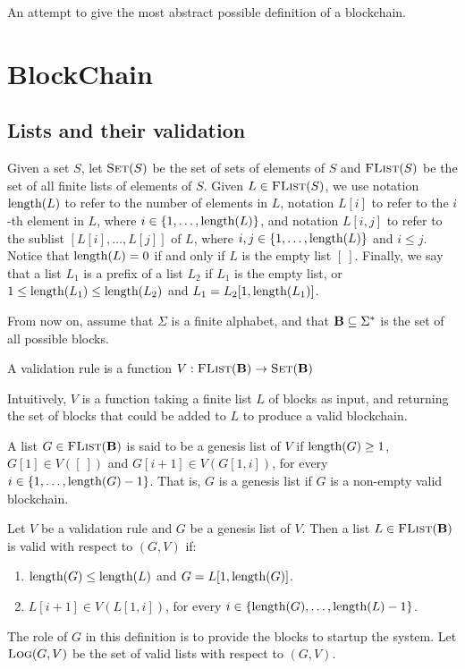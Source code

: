 
An attempt to give the most abstract possible definition of a blockchain.

\section{BlockChain}

\subsection{Lists and their validation}

Given a set $S$, let $\text{\sc Set}(S)$ be the set of sets of elements of $S$ and $\text{\sc FList}(S)$ be the set of all finite lists of elements of $S$. Given $L \in \text{\sc FList}(S)$, we use notation $\text{\rm length}(L)$ to refer to the number of elements in $L$, notation $L[i]$ to refer to the $i$-th element in $L$, where $i \in \{1, \ldots, \text{\rm length}(L)\}$, and notation $L[i,j]$ to refer to the sublist $[L[i], \ldots, L[j]]$ of $L$, where $i,j \in \{1, \ldots, \text{\rm length}(L)\}$ and $i \leq j$. Notice that $\text{\rm length}(L) = 0$ if and only if $L$ is the empty list $[\ ]$. Finally, we say that a list $L_1$ is a prefix of a list $L_2$ if $L_1$ is the empty list, or $1 \leq \text{\rm length}(L_1) \leq \text{\rm length}(L_2)$ and $L_1 = L_2[1, \text{\rm length}(L_1)]$. 

From now on, assume that $\Sigma$ is a finite alphabet, and that $\text{\bf B} \subseteq \Sigma^*$ is the set of all possible blocks.  

\begin{mydef}
	A validation rule is a function $V : \text{\sc FList}(\text{\bf B}) \to \text{\sc Set}(\text{\bf B})$
\end{mydef}
Intuitively, $V$ is a function taking a finite list $L$ of blocks as input, and returning the set of blocks that could be added to $L$ to produce a valid blockchain.

A list $G \in \text{\sc FList}(\text{\bf B})$  is said to be a genesis list of $V$ if $\text{\rm length}(G) \geq 1$, $G[1] \in V([\ ])$ and $G[i+1] \in V(G[1,i])$, for every $i \in \{1, \ldots, \text{\rm length}(G)-1\}$. That is, $G$ is a genesis list if $G$ is a non-empty valid blockchain. 
\begin{mydef}
	Let $V$ be a validation rule and $G$ be a genesis list of $V$. Then a list $L \in \text{\sc FList}(\text{\bf B})$ is valid with respect to $(G,V)$ if:
	\begin{enumerate}
		\item $\text{\rm length}(G) \leq \text{\rm length}(L)$ and $G = L[1,\text{\rm length}(G)]$.
		
		\item $L[i+1] \in V(L[1,i])$, for every $i \in \{\text{\rm length}(G), \ldots, \text{\rm length}(L)-1\}$.
	\end{enumerate}
\end{mydef}
The role of $G$ in this definition is to provide the blocks to startup the system. Let $\text{\sc Log}(G,V)$ be the set of valid lists with respect to $(G,V)$.

